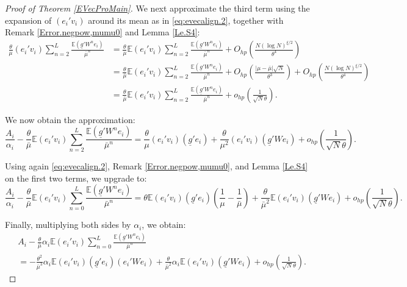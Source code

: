 \documentclass[11pt, reqno]{amsart}
\numberwithin{equation}{section}
\begin{document}
\begin{proof}[Proof of Theorem \ref{EVecProMain}]
We next approximate the third term using the expansion of \( (e_i' v_i) \) around its mean as in \eqref{eq:evecalign.2}, together with Remark \ref{Error.negpow,mumu0} and Lemma \ref{Le.S4}:
\begin{align*}
\frac{\theta}{\mu}(e_i' v_i) \sum_{n=2}^L \frac{ \mathbb{E}(\underline{g}' W^n e_i) }{ \bar{\mu}^n }
&= \frac{\theta}{\mu} \mathbb{E}(e_i' v_i) \sum_{n=2}^L \frac{ \mathbb{E}(\underline{g}' W^n e_i) }{ \bar{\mu}^n } 
+ O_{hp}\left( \frac{N(\log N)^{\xi/2}}{\theta^4} \right) \\
&= \frac{\theta}{\bar{\mu}} \mathbb{E}(e_i' v_i) \sum_{n=2}^L \frac{ \mathbb{E}(\underline{g}' W^n e_i) }{ \bar{\mu}^n } 
+ O_{hp}\left( \frac{|\mu - \bar{\mu}| \sqrt{N}}{\theta^3} \right) 
+ O_{hp}\left( \frac{N(\log N)^{\xi/2}}{\theta^4} \right) \\
&= \frac{\theta}{\bar{\mu}} \mathbb{E}(e_i' v_i) \sum_{n=2}^L \frac{ \mathbb{E}(\underline{g}' W^n e_i) }{ \bar{\mu}^n } 
+ o_{hp}\left( \frac{1}{\sqrt{N} \theta} \right).
\end{align*}

We now obtain the approximation:
\begin{equation}\label{EVecproTh1.2}
\frac{A_i}{\alpha_i} - \frac{\theta}{\bar{\mu}} \mathbb{E}(e_i' v_i) \sum_{n=2}^L \frac{ \mathbb{E}(\underline{g}' W^n e_i) }{ \bar{\mu}^n }
= \frac{\theta}{\mu}(e_i' v_i)(\underline{g}' e_i) 
+ \frac{\theta}{\mu^2}(e_i' v_i)(\underline{g}' W e_i) 
+ o_{hp}\left( \frac{1}{\sqrt{N} \theta} \right).
\end{equation}

Using again \eqref{eq:evecalign.2}, Remark \ref{Error.negpow,mumu0}, and Lemma \ref{Le.S4} on the first two terms, we upgrade to:
\begin{equation}\label{EVecproTh1.3}
\frac{A_i}{\alpha_i} - \frac{\theta}{\bar{\mu}} \mathbb{E}(e_i' v_i) \sum_{n=0}^L \frac{ \mathbb{E}(\underline{g}' W^n e_i) }{ \bar{\mu}^n }
= \theta \mathbb{E}(e_i' v_i)(\underline{g}' e_i) \left( \frac{1}{\mu} - \frac{1}{\bar{\mu}} \right) 
+ \frac{\theta}{\bar{\mu}^2} \mathbb{E}(e_i' v_i)(\underline{g}' W e_i) 
+ o_{hp}\left( \frac{1}{\sqrt{N} \theta} \right).
\end{equation}

Finally, multiplying both sides by \( \alpha_i \), we obtain:
\begin{align}\label{EVecproTh1.4}
&A_i - \frac{\theta}{\bar{\mu}} \alpha_i \mathbb{E}(e_i' v_i) \sum_{n=0}^L \frac{ \mathbb{E}(\underline{g}' W^n e_i) }{ \bar{\mu}^n }\nonumber\\
&=- \frac{\theta^2}{\bar{\mu}^3} \alpha_i \mathbb{E}(e_i' v_i)(\underline{g}' e_i)(e_i' W e_i) + \frac{\theta}{\bar{\mu}^2} \alpha_i \mathbb{E}(e_i' v_i)(\underline{g}' W e_i) 
+ o_{hp}\left( \frac{1}{\sqrt{N} \theta} \right).
\end{align}


\end{proof}
\end{document}
